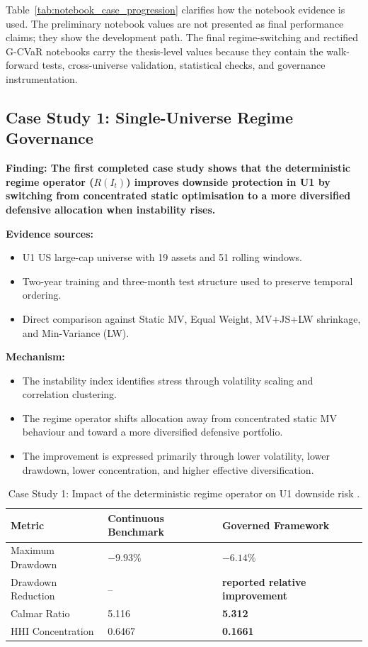 \documentclass[11pt]{article}
\newcommand{\finding}[1]{{\large\textbf{\textcolor{resultgreen}{Finding: }}\textbf{#1}}}
\begin{document}
Table~\ref{tab:notebook_case_progression} clarifies how the notebook evidence is used. The preliminary notebook values are not presented as final performance claims; they show the development path. The final regime-switching and rectified G-CVaR notebooks carry the thesis-level values because they contain the walk-forward tests, cross-universe validation, statistical checks, and governance instrumentation.

\subsection{Case Study 1: Single-Universe Regime Governance}

\finding{The first completed case study shows that the deterministic regime operator ($R(I_t)$) improves downside protection in U1 by switching from concentrated static optimisation to a more diversified defensive allocation when instability rises.}

\textbf{Evidence sources:}
\begin{itemize}
  \item U1 US large-cap universe with 19 assets and 51 rolling windows.
  \item Two-year training and three-month test structure used to preserve temporal ordering.
  \item Direct comparison against Static MV, Equal Weight, MV+JS+LW shrinkage, and Min-Variance (LW).
\end{itemize}

\textbf{Mechanism:}
\begin{itemize}
  \item The instability index identifies stress through volatility scaling and correlation clustering.
  \item The regime operator shifts allocation away from concentrated static MV behaviour and toward a more diversified defensive portfolio.
  \item The improvement is expressed primarily through lower volatility, lower drawdown, lower concentration, and higher effective diversification.
\end{itemize}

\begin{table}[htbp]
\centering
\begin{tabular}{L{3.2cm}L{3.8cm}L{3.6cm}}
\toprule
\textbf{Metric} & \textbf{Continuous Benchmark} & \textbf{Governed Framework} \\
\midrule
Maximum Drawdown & $-9.93\%$ & \textbf{$-6.14\%$} \\
Drawdown Reduction & -- & \textbf{reported relative improvement} \\
Calmar Ratio & 5.116 & \textbf{5.312} \\
HHI Concentration & 0.6467 & \textbf{0.1661} \\
\bottomrule
\end{tabular}
\caption{Case Study 1: Impact of the deterministic regime operator on U1 downside risk \cite{subramanyam2026a}.}
\label{tab:finding1}
\end{table}
\end{document}

